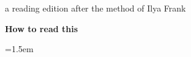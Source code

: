 
\frenchspacing

\thispagestyle{empty}
\vspace*{\fill}
{\ifFrankHasAlt\FrankAltFont\fi\fontsize{30}{50}\selectfont\color{ink}
 \begin{otherlanguage}{\FrankLangName}\centering\BookTitle\par\end{otherlanguage}}
\vspace{4mm}
{\SzPlain\color{ink}
 \begin{otherlanguage}{\FrankLangName}\centering\BookAuthor\par\end{otherlanguage}}
\vspace{10mm}
{\centering\color{gloss}\normalfont\small
 \BookTitleLatin\\[2pt]
 \textit{\BookAuthorLatin}\\[10pt]
 {\footnotesize a reading edition after the method of Ilya Frank}\par}
\vspace*{\fill}
\clearpage

\thispagestyle{empty}
{\centering\normalfont\small\textbf{How to read this}\par}
\vspace{2.5mm}
{\normalfont\footnotesize\color{ink}\emergencystretch=1.5em
\FrankHowTo
\par}
\clearpage

\frankcontents
\clearpage
{}

